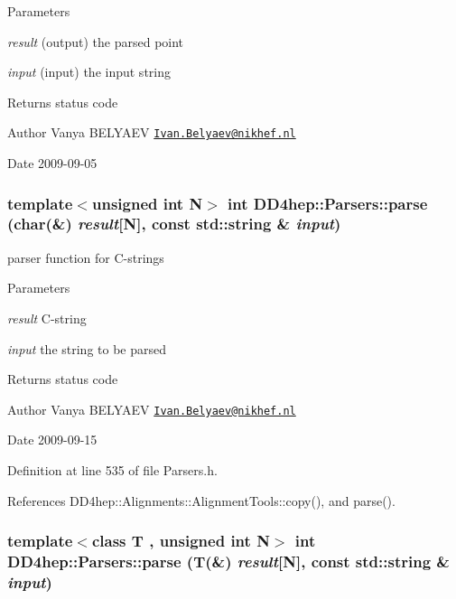 \begin{DoxyParams}{Parameters}
\item[{\em result}](output) the parsed point \item[{\em input}](input) the input string \end{DoxyParams}
\begin{DoxyReturn}{Returns}
status code 
\end{DoxyReturn}
\begin{DoxyAuthor}{Author}
Vanya BELYAEV \href{mailto:Ivan.Belyaev@nikhef.nl}{\tt Ivan.Belyaev@nikhef.nl} 
\end{DoxyAuthor}
\begin{DoxyDate}{Date}
2009-\/09-\/05 
\end{DoxyDate}
\hypertarget{namespace_d_d4hep_1_1_parsers_ad2e179991b827ffa95098ca1549db981}{
\subsubsection[{parse}]{\setlength{\rightskip}{0pt plus 5cm}template$<$unsigned int N$>$ int DD4hep::Parsers::parse (char(\&) {\em result}\mbox{[}N\mbox{]}, \/  const std::string \& {\em input})}}
\label{namespace_d_d4hep_1_1_parsers_ad2e179991b827ffa95098ca1549db981}


parser function for C-\/strings 
\begin{DoxyParams}{Parameters}
\item[{\em result}]C-\/string \item[{\em input}]the string to be parsed \end{DoxyParams}
\begin{DoxyReturn}{Returns}
status code 
\end{DoxyReturn}
\begin{DoxyAuthor}{Author}
Vanya BELYAEV \href{mailto:Ivan.Belyaev@nikhef.nl}{\tt Ivan.Belyaev@nikhef.nl} 
\end{DoxyAuthor}
\begin{DoxyDate}{Date}
2009-\/09-\/15 
\end{DoxyDate}


Definition at line 535 of file Parsers.h.

References DD4hep::Alignments::AlignmentTools::copy(), and parse().\hypertarget{namespace_d_d4hep_1_1_parsers_ae69a0a480d1612aabcd8a37624dc1c1b}{
\subsubsection[{parse}]{\setlength{\rightskip}{0pt plus 5cm}template$<$class T , unsigned int N$>$ int DD4hep::Parsers::parse ({\bf T}(\&) {\em result}\mbox{[}N\mbox{]}, \/  const std::string \& {\em input})}}
\label{namespace_d_d4hep_1_1_parsers_ae69a0a480d1612aabcd8a37624dc1c1b}


